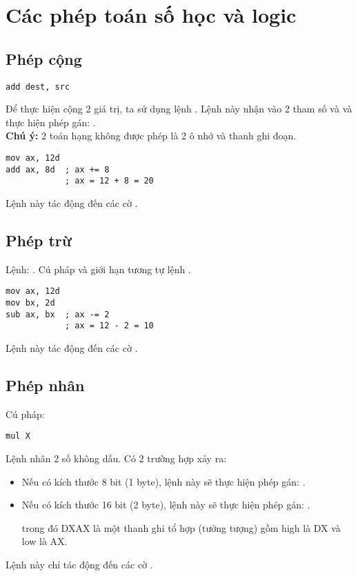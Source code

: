 \documentclass[main.tex]{subfiles}
\begin{document}
\section{Các phép toán số học và logic} \label{sec:pheptoan}
\subsection{Phép cộng} \label{subsec:phepcong}
\begin{verbatim}
add dest, src
\end{verbatim}
Để thực hiện cộng 2 giá trị, ta sử dụng lệnh . Lệnh này nhận vào 2 tham số  và  và thực hiện phép gán: .\\
\textbf{Chú ý:} 2 toán hạng không được phép là 2 ô nhớ và thanh ghi đoạn.
\begin{verbatim}
mov ax, 12d 
add ax, 8d  ; ax += 8
            ; ax = 12 + 8 = 20 
\end{verbatim}
Lệnh này tác động đến các cờ .

\subsection{Phép trừ}
Lệnh: . Cú pháp và giới hạn tương tự lệnh .
\begin{verbatim}
mov ax, 12d 
mov bx, 2d
sub ax, bx  ; ax -= 2
            ; ax = 12 - 2 = 10 
\end{verbatim}
Lệnh này tác động đến các cờ .

\subsection{Phép nhân}
Cú pháp: 
\begin{verbatim}
mul X
\end{verbatim}
Lệnh  nhân 2 số không dấu.
Có 2 trường hợp xảy ra:
\begin{itemize}
    \item Nếu  có kích thước 8 bit (1 byte), lệnh này sẽ thực hiện phép gán: .
    \item Nếu  có kích thước 16 bit (2 byte), lệnh này sẽ thực hiện phép gán: .
    \par trong đó DXAX là một thanh ghi tổ hợp (tưởng tượng) gồm high là DX và low là AX.
\end{itemize} 
Lệnh này chỉ tác động đến các cờ .
\end{document}
